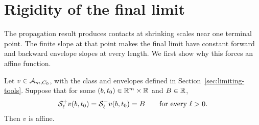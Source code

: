 \section{Rigidity of the final limit}\label{sec:rigidity}

The propagation result produces contacts at shrinking scales near one terminal point. The finite slope at that point makes the final limit have constant forward and backward envelope slopes at every length. We first show why this forces an affine function.

\begin{lemma}\label{lem:slope-rigidity}
Let $v\in\mathcal{A}_{m,C_0}$, with the class and envelopes defined in Section~\ref{sec:limiting-tools}. Suppose that for some $(b,t_0)\in\mathbb{R}^m\times\mathbb{R}$ and $B\in\mathbb{R}$,
\begin{equation}\label{eq:constant-envelope-slopes}
  \mathcal{S}_\ell^+v(b,t_0)=\mathcal{S}_\ell^-v(b,t_0)=B
       \qquad\text{for every }\ell>0.
\end{equation}
Then $v$ is affine.
\end{lemma}

